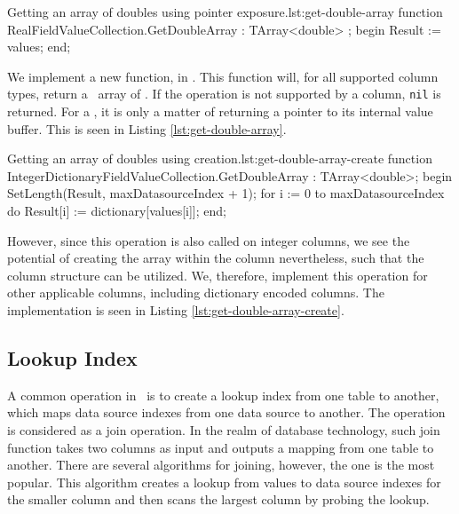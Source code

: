 
\begin{delphicode}{Getting an array of doubles using pointer exposure.}{lst:get-double-array}
function RealFieldValueCollection.GetDoubleArray
: TArray<double> ;
begin
  Result := values;
end;
\end{delphicode}
We implement a new function,  in . This function will, for all supported column types, return a \delphi~array of . If the operation is not supported by a column, \texttt{nil} is returned. For a , it is only a matter of returning a pointer to its internal value buffer.  This is seen in Listing \ref{lst:get-double-array}.
\begin{delphicode}{Getting an array of doubles using creation.}{lst:get-double-array-create}
function IntegerDictionaryFieldValueCollection.GetDoubleArray
: TArray<double>;
begin
  SetLength(Result, maxDatasourceIndex + 1);
  for i := 0 to maxDatasourceIndex do
    Result[i] := dictionary[values[i]];
end;
\end{delphicode}
However, since this operation is also called on integer columns, we see the potential of creating the array within the column nevertheless, such that the column structure can be utilized. We, therefore, implement this operation for other applicable columns, including dictionary encoded columns. The implementation is seen in Listing \ref{lst:get-double-array-create}.

\subsection{Lookup Index}
\label{sub:Lookup Index}
A common operation in \bd~is to create a lookup index from one table to another, which maps data source indexes from one data source to another. The operation is considered as a join operation. In the realm of database technology, such join function takes two columns as input and outputs a mapping from one table to another. There are several algorithms for joining, however, the  one is the most popular. This algorithm creates a lookup from values to data source indexes for the smaller column and then scans the largest column by probing the lookup.  

